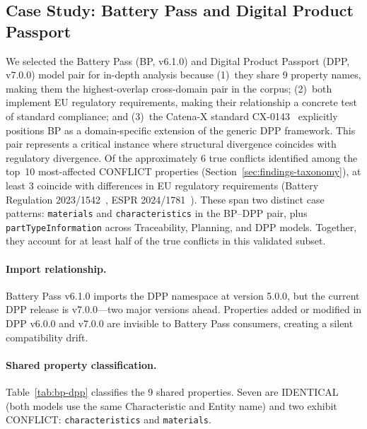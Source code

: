 \documentclass[]{ceurart}
\begin{document}
\subsection{Case Study: Battery Pass and Digital Product Passport}%
\label{sec:findings-case-study}

We selected the Battery Pass (BP, v6.1.0) and Digital Product Passport
(DPP, v7.0.0) model pair for in-depth analysis because (1)~they share 9
property names, making them the highest-overlap cross-domain pair in the
corpus; (2)~both implement EU regulatory requirements, making their
relationship a concrete test of standard compliance; and (3)~the Catena-X
standard CX-0143~\cite{cx0143dpp} explicitly positions BP as a
domain-specific extension of the generic DPP framework. This pair represents a critical instance where structural divergence
coincides with regulatory divergence. Of the approximately 6 true
conflicts identified among the top~10 most-affected CONFLICT properties
(Section~\ref{sec:findings-taxonomy}), at least 3 coincide with
differences in EU regulatory requirements (Battery Regulation
2023/1542~\cite{eu2023battery}, ESPR
2024/1781~\cite{eu2024espr}). These span two distinct case patterns:
\texttt{materials} and \texttt{characteristics} in the BP--DPP pair,
plus \texttt{partTypeInformation} across Traceability, Planning, and
DPP models. Together, they account for at least half of the true
conflicts in this validated subset.

\paragraph{Import relationship.}
Battery Pass v6.1.0 imports the DPP namespace at version 5.0.0, but
the current DPP release is v7.0.0---two major versions ahead. Properties
added or modified in DPP v6.0.0 and v7.0.0 are invisible to Battery Pass
consumers, creating a silent compatibility drift.

\paragraph{Shared property classification.}
Table~\ref{tab:bp-dpp} classifies the 9 shared properties. Seven are
IDENTICAL (both models use the same Characteristic and Entity name) and
two exhibit CONFLICT: \texttt{characteristics} and \texttt{materials}.
\end{document}
